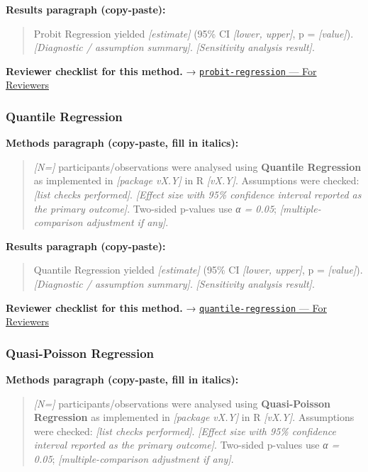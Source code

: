 \documentclass[
]{article}
\begin{document}
\textbf{Results paragraph (copy-paste):}

\begin{quote}
Probit Regression yielded \emph{{[}estimate{]}} (95\% CI \emph{{[}lower,
upper{]}}, p = \emph{{[}value{]}}). \emph{{[}Diagnostic / assumption
summary{]}}. \emph{{[}Sensitivity analysis result{]}}.
\end{quote}

\textbf{Reviewer checklist for this method.} →
\href{../chapters/07-regression/probit-regression.Rmd\#for-reviewers}{\texttt{probit-regression}
--- For Reviewers}

\subsubsection{Quantile Regression}\label{quantile-regression}

\textbf{Methods paragraph (copy-paste, fill in italics):}

\begin{quote}
\emph{{[}N={]}} participants/observations were analysed using
\textbf{Quantile Regression} as implemented in \emph{{[}package vX.Y{]}}
in R \emph{{[}vX.Y{]}}. Assumptions were checked: \emph{{[}list checks
performed{]}}. \emph{{[}Effect size with 95\% confidence interval
reported as the primary outcome{]}}. Two-sided p-values use \emph{α =
0.05}; \emph{{[}multiple-comparison adjustment if any{]}}.
\end{quote}

\textbf{Results paragraph (copy-paste):}

\begin{quote}
Quantile Regression yielded \emph{{[}estimate{]}} (95\% CI
\emph{{[}lower, upper{]}}, p = \emph{{[}value{]}}). \emph{{[}Diagnostic
/ assumption summary{]}}. \emph{{[}Sensitivity analysis result{]}}.
\end{quote}

\textbf{Reviewer checklist for this method.} →
\href{../chapters/07-regression/quantile-regression.Rmd\#for-reviewers}{\texttt{quantile-regression}
--- For Reviewers}

\subsubsection{Quasi-Poisson Regression}\label{quasi-poisson-regression}

\textbf{Methods paragraph (copy-paste, fill in italics):}

\begin{quote}
\emph{{[}N={]}} participants/observations were analysed using
\textbf{Quasi-Poisson Regression} as implemented in \emph{{[}package
vX.Y{]}} in R \emph{{[}vX.Y{]}}. Assumptions were checked: \emph{{[}list
checks performed{]}}. \emph{{[}Effect size with 95\% confidence interval
reported as the primary outcome{]}}. Two-sided p-values use \emph{α =
0.05}; \emph{{[}multiple-comparison adjustment if any{]}}.
\end{quote}
\end{document}
